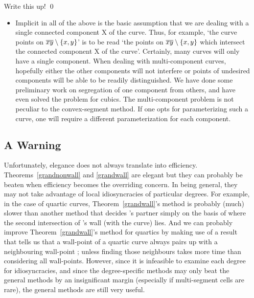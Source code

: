 \proof
Write this up!
\qed
\begin{itemize}
\item Implicit in all of the above is the basic assumption that we are
dealing with a single connected component X of the curve.
Thus, for example, `the curve points on $\mbox{$\overline{xy}$} \setminus \{x,y\}$'
is to be read `the points on $\mbox{$\overline{xy}$} \setminus \{x,y\}$ which
intersect the connected component X of the curve'.
Certainly, many curves will only have a single component.
When dealing with multi-component curves, hopefully either the other
components will not interfere or points of undesired components will be
able to be readily distinguished.
We have done some preliminary work on segregation of one component from
others, and have even solved the problem for cubics.
The multi-component problem is not peculiar to the convex-segment method.
If one opts for parameterizing such a curve, one will require a different
parameterization for each component.
\end{itemize}
\subsection{A Warning}
Unfortunately, elegance does not always translate into efficiency.
Theorems~\ref{grandnonwall} and \ref{grandwall} are elegant but they can
probably be beaten when efficiency becomes the overriding concern.
In being general, they may not take advantage of local idiosyncracies of
particular degrees.
For example, in the case of quartic curves, Theorem~\ref{grandwall}'s 
method is probably (much) slower than another method 
that decides \wone's partner simply on the basis of where 
the second intersection
of \wone's wall (with the curve) lies.
And we can probably improve Theorem~\ref{grandwall}'s method 
for quartics by making 
use of a result that tells us that a wall-point of a quartic curve 
always pairs up with a neighbouring wall-point ; unless finding those
neighbours takes more time than considering all wall-points.
However, since it is infeasible  to examine each degree for idiosyncracies,
and since the degree-specific methods may only beat the general methods by
an insignificant margin (especially if multi-segment cells are rare),
the general methods are still very useful.

